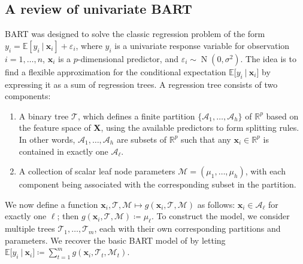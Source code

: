 \documentclass[aoas,preprint]{imsart}
\newcommand\given[1][]{\:#1\vert\:}
\theoremstyle{plain}
\theoremstyle{definition}
\theoremstyle{remark}
\begin{document}
\subsection{A review of univariate BART}\label{sec:review_BART} 
BART was designed to solve the classic regression problem of the form
$y_i = \mathbb{E}\left\lbrack y_i\given \mathbf{x}_i\right\rbrack + \varepsilon_i$,
where $y_i$ is a univariate response variable for observation $i=1,\ldots,n$, $\mathbf{x}_i$ is a $p$-dimensional predictor, and $\varepsilon_i \sim \operatorname{N}(0,\sigma^2)$. The idea is to find a flexible approximation for the conditional expectation $\mathbb{E}\lbrack y_i\given \mathbf{x}_i\rbrack$ by expressing it as a sum of regression trees.
A regression tree consists of two components:
\begin{enumerate}
    \item A binary tree $\mathcal{T}$, which defines a finite partition $\{\mathcal{A}_1,\ldots,\mathcal{A}_h\}$ of $\mathbb{R}^p$ based on the feature space of $\mathbf{X}$, using the available predictors 
    to form splitting rules. In other words, $\mathcal{A}_1,\ldots,\mathcal{A}_h$ are subsets of $\mathbb{R}^p$ such that any $\mathbf{x}_i \in \mathbb{R}^p$ is contained in exactly one $\mathcal{A}_\ell$.
    \item A collection of scalar leaf node parameters $\mathcal{M} = (\mu_1,\ldots,\mu_h)$, with each component being associated with the corresponding subset in the partition.
\end{enumerate}
We now define a function $\mathbf{x}_i,\mathcal{T},\mathcal{M} \mapsto g(\mathbf{x}_i,\mathcal{T},\mathcal{M})$ as follows: $\mathbf{x}_i \in \mathcal{A}_\ell$ for exactly one $\ell$; then $g(\mathbf{x}_i,\mathcal{T},\mathcal{M}) \coloneqq \mu_\ell$. 
To construct the model, we consider multiple trees $\mathcal{T}_1,\ldots,\mathcal{T}_m$, each with their own corresponding partitions and parameters. 
We recover the basic BART model of \citet{chipman2010bart} by letting $\mathbb{E}\lbrack y_i\given \mathbf{x}_i\rbrack \coloneqq
\sum^m_{t=1}  g(\mathbf{x}_i,\mathcal{T}_t,\mathcal{M}_t)$. 
\end{document}
